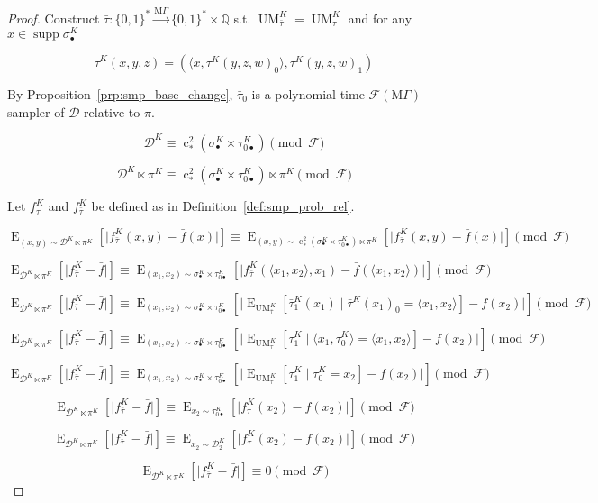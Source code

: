 \documentclass[11pt]{article}
\numberwithin{equation}{section}
\theoremstyle{definition}
\theoremstyle{plain}
\newcommand{\Bool}{\{0,1\}}
\newcommand{\Words}{{\Bool^*}}
\DeclareMathOperator{\Supp}{supp}
\DeclareMathOperator{\E}{E}
\DeclareMathOperator{\UM}{UM}
\DeclareMathOperator{\En}{c}
\newcommand{\Rats}{\mathbb{Q}}
\newcommand{\Abs}[1]{\lvert #1 \rvert}
\newcommand{\Chev}[1]{\langle #1 \rangle}
\newcommand{\Dist}{\mathcal{D}}
\newcommand{\MGrow}{\mathrm{M}\Gamma}
\newcommand{\Fall}{\mathcal{F}}
\newcommand{\EMG}{\Fall(\MGrow)}
\newcommand{\MScheme}{\xrightarrow{\MGrow}}
\begin{document}
\begin{proof}

Construct $\bar{\tau}: \Words \MScheme \Words \times \Rats$ s.t. $\UM_{\bar{\tau}}^K=\UM_{\tau}^K$ and for any ${x \in \Supp \sigma_{\bullet}^K}$

\[\bar{\tau}^K(x,y,z)=(\Chev{x,\tau^K(y,z,w)_0},\tau^K(y,z,w)_1)\] 

By Proposition~\ref{prp:smp_base_change}, $\bar{\tau}_0$ is a polynomial-time $\EMG$-sampler of $\Dist$ relative to $\pi$.

\[\Dist^{K} \equiv \En_*^2(\sigma_\bullet^K \times \tau_{0\bullet}^K)\pmod \Fall\]

\[\Dist^{K} \ltimes \pi^K \equiv \En_*^2(\sigma_\bullet^K \times \tau_{0\bullet}^K) \ltimes \pi^K \pmod \Fall\]

Let ${f_\tau^K}$ and ${f_{\bar{\tau}}^K}$ be defined as in Definition~\ref{def:smp_prob_rel}.

\[\E_{(x,y) \sim \Dist^{K} \ltimes \pi^K}[\Abs{f_{\bar{\tau}}^K(x,y)-\bar{f}(x)}] \equiv \E_{(x,y) \sim \En_*^2(\sigma_\bullet^K \times \tau_{0\bullet}^K) \ltimes \pi^K}[\Abs{f_{\bar{\tau}}^K(x,y)-\bar{f}(x)}] \pmod \Fall\]

\[\E_{ \Dist^{K} \ltimes \pi^K}[\Abs{f_{\bar{\tau}}^K-\bar{f}}] \equiv \E_{(x_1,x_2) \sim \sigma_\bullet^K \times \tau_{0\bullet}^K}[\Abs{f_{\bar{\tau}}^K(\Chev{x_1,x_2},x_1)-\bar{f}(\Chev{x_1,x_2})}] \pmod \Fall\]

\[\E_{ \Dist^{K} \ltimes \pi^K}[\Abs{f_{\bar{\tau}}^K-\bar{f}}] \equiv \E_{(x_1,x_2) \sim \sigma_\bullet^K \times \tau_{0\bullet}^K}[\Abs{\E_{\UM_{\bar{\tau}}^K}[\bar{\tau}_1^K(x_1) \mid \bar{\tau}^K(x_1)_0 = \Chev{x_1,x_2}]-f(x_2)}] \pmod \Fall\]

\[\E_{\Dist^{K} \ltimes \pi^K}[\Abs{f_{\bar{\tau}}^K-\bar{f}}] \equiv \E_{(x_1,x_2) \sim \sigma_\bullet^K \times \tau_{0\bullet}^K}[\Abs{\E_{\UM_\tau^K}[\tau_1^K \mid \Chev{x_1,\tau_0^K} = \Chev{x_1,x_2}]-f(x_2)}] \pmod \Fall\]

\[\E_{\Dist^{K} \ltimes \pi^K}[\Abs{f_{\bar{\tau}}^K-\bar{f}}] \equiv \E_{(x_1,x_2) \sim \sigma_\bullet^K \times \tau_{0\bullet}^K}[\Abs{\E_{\UM_\tau^K}[\tau_1^K \mid \tau_0^K = x_2]-f(x_2)}] \pmod \Fall\]

\[\E_{\Dist^{K} \ltimes \pi^K}[\Abs{f_{\bar{\tau}}^K-\bar{f}}] \equiv \E_{x_2 \sim \tau_{0\bullet}^K}[\Abs{f_\tau^K(x_2)-f(x_2)}] \pmod \Fall\]

\[\E_{\Dist^{K} \ltimes \pi^K}[\Abs{f_{\bar{\tau}}^K-\bar{f}}] \equiv \E_{x_2 \sim \Dist_2^{K}}[\Abs{f_\tau^K(x_2)-f(x_2)}] \pmod \Fall\]

\[\E_{\Dist^{K} \ltimes \pi^K}[\Abs{f_{\bar{\tau}}^K-\bar{f}}] \equiv 0 \pmod \Fall\]
\end{proof}
\end{document}
